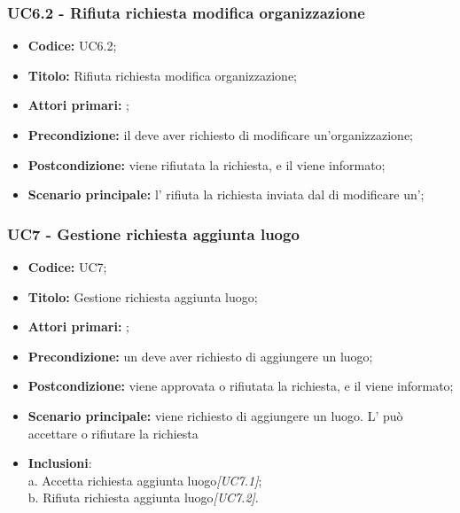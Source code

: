 \documentclass[casi-duso]{subfiles}
\begin{document}
\subsubsection{UC6.2 - Rifiuta richiesta modifica organizzazione}
\label{subsub:UC6.2}
\begin{itemize}
  \item \textbf{Codice:} UC6.2;
  \item \textbf{Titolo:} Rifiuta richiesta modifica organizzazione;
  \item \textbf{Attori primari:} ;
  \item \textbf{Precondizione:} il  deve aver richiesto di modificare un'organizzazione;
  \item \textbf{Postcondizione:} viene rifiutata la richiesta, e il  viene informato;
  \item \textbf{Scenario principale:} l' rifiuta la richiesta inviata dal  di modificare
  un';
\end{itemize}


\subsubsection{UC7 - Gestione richiesta aggiunta luogo}
\label{subsub:UC7}

\begin{itemize}
  \item \textbf{Codice:} UC7;
  \item \textbf{Titolo:} Gestione richiesta aggiunta luogo;
  \item \textbf{Attori primari:} ;
  \item \textbf{Precondizione:} un  deve aver richiesto di aggiungere un luogo;
  \item \textbf{Postcondizione:} viene approvata o rifiutata la richiesta, e il  viene informato;
  \item \textbf{Scenario principale:} viene richiesto di aggiungere un luogo. L' può accettare o rifiutare la richiesta
  \item \textbf{Inclusioni}:
        \\a. Accetta richiesta aggiunta luogo\emph{[UC7.1]};
        \\b. Rifiuta richiesta aggiunta luogo\emph{[UC7.2]}.

\end{itemize}
\end{document}
